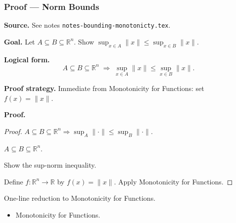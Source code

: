 
\clearpage
{}
\hypertarget{proof-RA-ABB-P-norm-bounds}{}

\subsubsection[Norm Bounds]{Proof --- Norm Bounds}

\bigskip

\noindent
\textbf{Source.}
See notes \texttt{notes-bounding-monotonicty.tex}.

\vspace{0.75em}

\noindent
\textbf{Goal.}
Let $A \subseteq B \subseteq \mathbb{R}^n$.
Show $\sup_{x \in A} \|x\| \le \sup_{x \in B} \|x\|$.

\vspace{0.75em}

\noindent
\textbf{Logical form.}
\[
  A \subseteq B \subseteq \mathbb{R}^n
  \;\Rightarrow\;
  \sup_{x \in A}\|x\| \le \sup_{x \in B}\|x\|.
\]

\vspace{0.75em}

\noindent
\textbf{Proof strategy.}
Immediate from Monotonicity for Functions: set $f(x) = \|x\|$.

\vspace{0.75em}

\noindent
\textbf{Proof.}
\begin{proof}
\Claim $A \subseteq B \subseteq \mathbb{R}^n \Rightarrow \sup_{A}\|\cdot\| \le \sup_{B}\|\cdot\|$.

\Given $A \subseteq B \subseteq \mathbb{R}^n$.

\Goal Show the sup-norm inequality.

\Strategy Define $f : \mathbb{R}^n \to \mathbb{R}$ by $f(x) = \|x\|$.
Apply Monotonicity for Functions.

\medskip


\end{proof}

\begin{remark*}
One-line reduction to Monotonicity for Functions.
\end{remark*}

\begin{remark*}[Dependencies]
\begin{itemize}
  \item Monotonicity for Functions.
\end{itemize}
\end{remark*}
